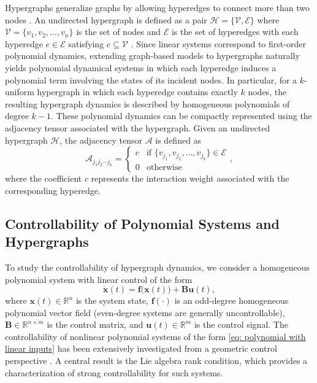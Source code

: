 \documentclass[journal,twoside,web]{ieeecolor}
\begin{document}
Hypergraphs generalize graphs by allowing hyperedges to connect more than two nodes \cite{berge1984hypergraphs}.
%
An undirected hypergraph is defined as a pair $\mathcal{H}=\{\mathcal{V},\mathcal{E}\}$ where $\mathcal{V}=\{v_1,v_2,\dots,v_n\}$ is the set of nodes and  $\mathcal{E}$ is the set of hyperedges with each hyperedge $e\in\mathcal{E}$ satisfying $e\subseteq\mathcal{V}$ \cite{berge1984hypergraphs}.
%
Since linear systems correspond to first-order polynomial dynamics, extending graph-based models to hypergraphs naturally yields polynomial dynamical systems in which each hyperedge induces a polynomial term involving the states of its incident nodes.
%
In particular, for a $k$-uniform hypergraph in which each hyperedge contains exactly $k$ nodes, the resulting hypergraph dynamics is described by homogeneous polynomials of degree $k-1$.
%
These polynomial dynamics can be compactly represented using the adjacency tensor associated with the hypergraph.
%
Given an undirected hypergraph $\mathcal{H}$, the adjacency tensor $\mathscr{A}$ is defined as
\begin{equation*}\label{eq: adjacency tensor}
    \mathscr{A}_{j_1j_2\cdots j_k}=\begin{cases}
        c&\text{if } \{v_{j_1},v_{j_2},\dots,v_{j_k}\}\in\mathcal{E}\\
        0&\text{otherwise}
    \end{cases},
\end{equation*}
where the coefficient $c$ represents the interaction weight associated with the corresponding hyperedge.


\subsection{Controllability of Polynomial  Systems and Hypergraphs}
To study the controllability of hypergraph dynamics, we consider a homogeneous polynomial  system with linear control of the form
\begin{equation}\label{eq: polynomial with linear inputs}
    \dot{\textbf{x}}(t)=\textbf{f}\big(\textbf{x}(t)\big)+\textbf{B}\textbf{u}(t),
\end{equation}
where $\textbf{x}(t)\in\mathbb{R}^n$ is the system state, $\textbf{f}(\cdot)$ is an odd-degree homogeneous polynomial vector field (even-degree systems are generally uncontrollable), $\textbf{B}\in\mathbb{R}^{n\times m}$ is the control matrix, and $\textbf{u}(t)\in\mathbb{R}^m$ is the control signal.
%
The controllability of nonlinear polynomial systems of the form \eqref{eq: polynomial with linear inputs} has been extensively investigated from a geometric control perspective \cite{mayne1973geometric, hermann1977nonlinear, jurdjevic1981control, jurdjevic1983polynomial, baillieul1981controllability, jurdjevic1985polynomial, jurdjevic1997geometric}.
%
A central result is the Lie algebra rank condition, which provides a characterization of strong controllability for such systems.
\end{document}
